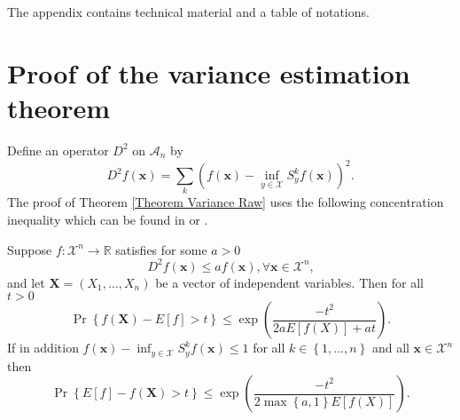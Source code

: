 \documentclass[final,12pt]{colt2018} %
\begin{document}
						\appendix
						The appendix contains technical material and a table of notations.
						\section{Proof of the variance estimation theorem\label{Subsection Proof Variance estimation}}
						
						Define an operator $D^{2}$ on $\mathcal{A}_{n}$ by 
						\begin{equation*}
						D^{2}f\left( \mathbf{x}\right) =\sum_{k}\left( f\left( \mathbf{x}\right)
						-\inf_{y\in \mathcal{X}}S_{y}^{k}f\left( \mathbf{x}\right) \right) ^{2}. 
						\end{equation*}%
						The proof of Theorem \ref{Theorem Variance Raw} uses the following
						concentration inequality which can be found in \citep[Theorem
						13]{Maurer 2006} or \cite{Boucheron13}.
						
						\begin{theorem}
							\label{Theorem selfbound}Suppose $f:\mathcal{X}^{n}\rightarrow 
							\mathbb{R}
							$ satisfies for some $a>0$%
							\begin{equation}
							D^{2}f\left( \mathbf{x}\right) \leq af\left( \mathbf{x}\right) ,\forall 
							\mathbf{x}\in \mathcal{X}^{n}\text{,}  \label{selfbound condition}
							\end{equation}%
							and let $\mathbf{X}=\left( X_{1},...,X_{n}\right) $ be a vector of
							independent variables. Then for all $t>0$%
							\begin{equation*}
							\Pr \left\{ f\left( \mathbf{X}\right) -E\left[ f\right] >t\right\} \leq \exp
							\left( \frac{-t^{2}}{2aE\left[ f\left( X\right) \right] +at}\right) \text{.} 
							\end{equation*}%
							If in addition $f\left( \mathbf{x}\right) -\inf_{y\in \mathcal{X}%
							}S_{y}^{k}f\left( \mathbf{x}\right) \leq 1$ for all $k\in \left\{
							1,...,n\right\} $ and all $\mathbf{x}\in \mathcal{X}^{n}$ then%
							\begin{equation*}
							\Pr \left\{ E\left[ f\right] -f\left( \mathbf{X}\right) >t\right\} \leq \exp
							\left( \frac{-t^{2}}{2\max \left\{ a,1\right\} E\left[ f\left( X\right) %
								\right] }\right) . 
							\end{equation*}
						\end{theorem}
						
\end{document}
